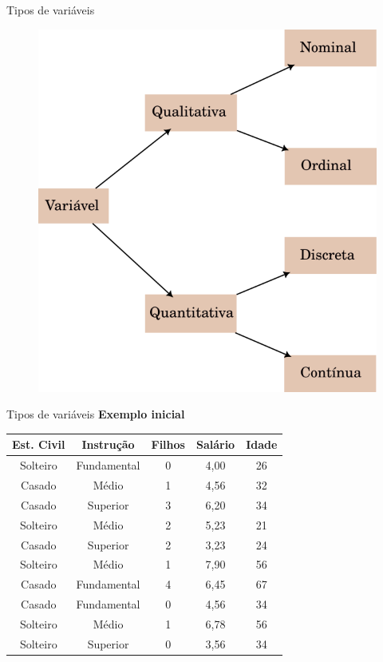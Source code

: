 \begin{frame}{Tipos de variáveis}
    \begin{figure}
        \centering
        \includegraphics[width=0.5\linewidth]{figures/classificacao_variaveis.png}
    \end{figure}
\end{frame}

\begin{frame}{Tipos de variáveis}
    \textbf{Exemplo inicial }
    \begin{table}[H]
\begin{tabular}{ccccc}
\hline
Est. Civil & Instrução & Filhos & Salário & Idade \\ \hline
Solteiro          & Fundamental         & 0      & 4,00    & 26    \\
Casado          & Médio         & 1      & 4,56    & 32    \\
Casado          & Superior         & 3      & 6,20    & 34    \\
Solteiro          & Médio         & 2      & 5,23    & 21    \\
Casado          & Superior         & 2      & 3,23    & 24    \\
Solteiro          & Médio         & 1      & 7,90    & 56    \\
Casado          & Fundamental         & 4      & 6,45    & 67    \\
Casado          & Fundamental         & 0      & 4,56    & 34    \\
Solteiro          & Médio         & 1      & 6,78    & 56    \\
Solteiro          & Superior         & 0      & 3,56    & 34    \\ \hline
\end{tabular}
\end{table}
\end{frame}

